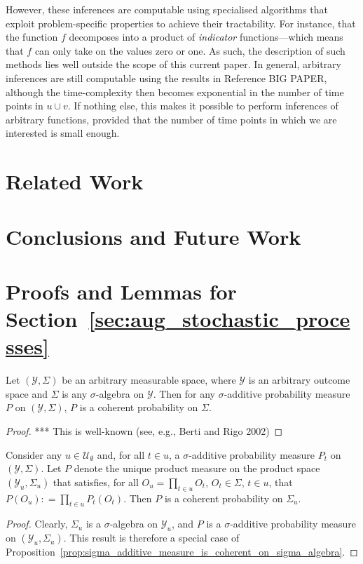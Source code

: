\documentclass[twoside,11pt]{article}
\newcommand{\observs}{\mathcal{Y}}
\newcommand{\coloneqq}{:\!=}
\begin{document}
However, these inferences are computable using specialised algorithms that exploit problem-specific properties to achieve their tractability. For instance, that the function $f$ decomposes into a product of \emph{indicator} functions---which means that $f$ can only take on the values zero or one. As such, the description of such methods lies well outside the scope of this current paper. In general, arbitrary inferences are still computable using the results in Reference BIG PAPER, although the time-complexity then becomes exponential in the number of time points in $u\cup v$. If nothing else, this makes it possible to perform inferences of arbitrary functions, provided that the number of time points in which we are interested is small enough.

\section{Related Work}\label{sec:related}

\section{Conclusions and Future Work}\label{sec:conclusions}




\newpage

\appendix


\section{Proofs and Lemmas for Section~\ref{sec:aug_stochastic_processes}}

\begin{proposition}\label{prop:sigma_additive_measure_is_coherent_on_sigma_algebra}
Let $(\observs,\Sigma)$ be an arbitrary measurable space, where $\observs$ is an arbitrary outcome space and $\Sigma$ is any $\sigma$-algebra on $\observs$. Then for any $\sigma$-additive probability measure $P$ on $(\observs,\Sigma)$, $P$ is a coherent probability on $\Sigma$.
\end{proposition}
\begin{proof}
*** This is well-known (see, e.g., Berti and Rigo 2002)
\end{proof}

\begin{corollary}\label{cor:product_measure_is_coherent}
Consider any $u\in\mathcal{U}_\emptyset$ and, for all $t\in u$, a $\sigma$-additive probability measure $P_t$ on $(\observs,\Sigma)$. Let $P$ denote the unique product measure on the product space $(\observs_u,\Sigma_u)$ that satisfies, for all $O_u=\prod_{t\in u} O_t$, $O_t\in\Sigma$, $t\in u$, that $P(O_u)\coloneqq \prod_{t\in u}P_t(O_t)$. Then $P$ is a coherent probability on $\Sigma_u$.
\end{corollary}
\begin{proof}
Clearly, $\Sigma_u$ is a $\sigma$-algebra on $\observs_u$, and $P$ is a $\sigma$-additive probability measure on $(\observs_u,\Sigma_u)$. This result is therefore a special case of Proposition~\ref{prop:sigma_additive_measure_is_coherent_on_sigma_algebra}.
\end{proof}
\end{document}
